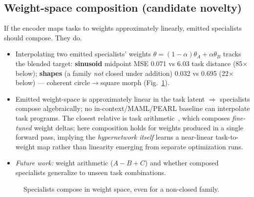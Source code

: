 \documentclass[11pt]{article}
\begin{document}
\subsection{Weight-space composition (candidate novelty)}\label{sec:compose}
If the encoder maps tasks to weights approximately linearly, emitted specialists
should compose. They do.
\begin{itemize}[leftmargin=1.4em]
  \item Interpolating two emitted specialists' weights
        $\theta=(1{-}\alpha)\theta_A+\alpha\theta_B$ tracks the blended target:
        \textbf{sinusoid} midpoint MSE 0.071 vs 6.03 task distance (85$\times$ below);
        \textbf{shapes} (a family \emph{not} closed under addition) 0.032 vs 0.695
        (22$\times$ below) --- coherent circle$\to$square morph (Fig.~\ref{fig:morph}).
  \item Emitted weight-space is approximately linear in the task latent $\Rightarrow$
        specialists compose algebraically; no in-context/MAML/PEARL baseline can
        interpolate task programs. The closest relative is task
        arithmetic~\citep{ilharco2023task}, which composes \emph{fine-tuned} weight
        deltas; here composition holds for weights produced in a single forward pass,
        implying the \emph{hypernetwork itself} learns a near-linear task-to-weight
        map rather than linearity emerging from separate optimization runs.
  \item \emph{Future work:} weight arithmetic ($A-B+C$) and whether composed
        specialists generalize to unseen task combinations.
\end{itemize}
\begin{figure}[h]\centering
{}
\caption{Specialists compose in weight space, even for a non-closed family.}
\label{fig:morph}
\end{figure}
\end{document}
